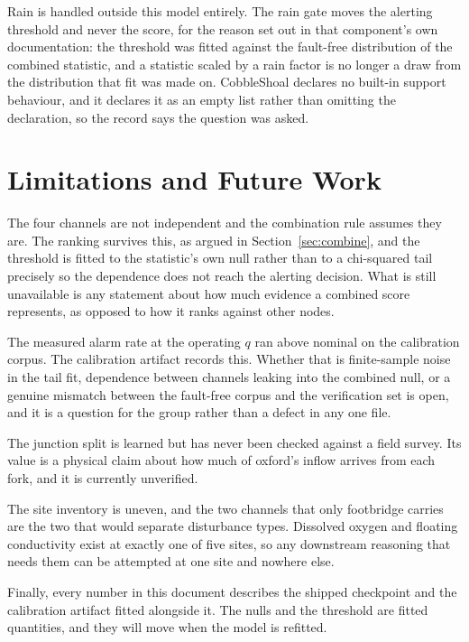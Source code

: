 \documentclass{article}
\begin{document}
Rain is handled outside this model entirely. The rain gate moves the alerting
threshold and never the score, for the reason set out in that component's own
documentation: the threshold was fitted against the fault-free distribution of
the combined statistic, and a statistic scaled by a rain factor is no longer a
draw from the distribution that fit was made on. CobbleShoal declares no
built-in support behaviour, and it declares it as an empty list rather than
omitting the declaration, so the record says the question was asked.

\section{Limitations and Future Work}
\label{sec:limitations}

The four channels are not independent and the combination rule assumes they
are. The ranking survives this, as argued in Section~\ref{sec:combine}, and the
threshold is fitted to the statistic's own null rather than to a chi-squared
tail precisely so the dependence does not reach the alerting decision. What is
still unavailable is any statement about how much evidence a combined score
represents, as opposed to how it ranks against other nodes.

The measured alarm rate at the operating $q$ ran above nominal on the
calibration corpus. The calibration artifact records this. Whether that is
finite-sample noise in the tail fit, dependence between channels leaking into
the combined null, or a genuine mismatch between the fault-free corpus and the
verification set is open, and it is a question for the group rather than a
defect in any one file.

The junction split is learned but has never been checked against a field
survey. Its value is a physical claim about how much of oxford's inflow arrives
from each fork, and it is currently unverified.

The site inventory is uneven, and the two channels that only footbridge carries
are the two that would separate disturbance types. Dissolved oxygen and floating
conductivity exist at exactly one of five sites, so any downstream reasoning
that needs them can be attempted at one site and nowhere else.

Finally, every number in this document describes the shipped checkpoint and the
calibration artifact fitted alongside it. The nulls and the threshold are
fitted quantities, and they will move when the model is refitted.



\end{document}
